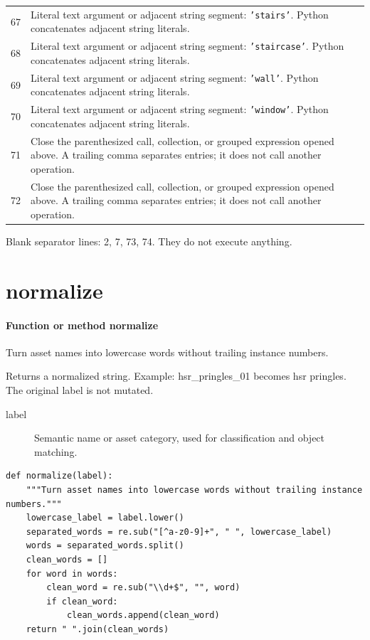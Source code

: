 \documentclass[11pt,a4paper]{book}
\begin{document}
\begin{longtable}{r p{}}
67 & Literal text argument or adjacent string segment: \texttt{'stairs'}. Python concatenates adjacent string literals. \\

68 & Literal text argument or adjacent string segment: \texttt{'staircase'}. Python concatenates adjacent string literals. \\

69 & Literal text argument or adjacent string segment: \texttt{'wall'}. Python concatenates adjacent string literals. \\

70 & Literal text argument or adjacent string segment: \texttt{'window'}. Python concatenates adjacent string literals. \\

71 & Close the parenthesized call, collection, or grouped expression opened above. A trailing comma separates entries; it does not call another operation. \\

72 & Close the parenthesized call, collection, or grouped expression opened above. A trailing comma separates entries; it does not call another operation. \\

\end{longtable}

Blank separator lines: 2, 7, 73, 74. They do not execute anything.

\section{normalize}

\paragraph{Function or method normalize}
Turn asset names into lowercase words without trailing instance numbers.

Returns a normalized string. Example: hsr\_pringles\_01 becomes hsr pringles. The original label is not mutated.

\begin{description}
\item[label] Semantic name or asset category, used for classification and object matching.
\end{description}

\begin{lstlisting}[firstnumber=75]
def normalize(label):
    """Turn asset names into lowercase words without trailing instance numbers."""
    lowercase_label = label.lower()
    separated_words = re.sub("[^a-z0-9]+", " ", lowercase_label)
    words = separated_words.split()
    clean_words = []
    for word in words:
        clean_word = re.sub("\\d+$", "", word)
        if clean_word:
            clean_words.append(clean_word)
    return " ".join(clean_words)


\end{lstlisting}
\end{document}
